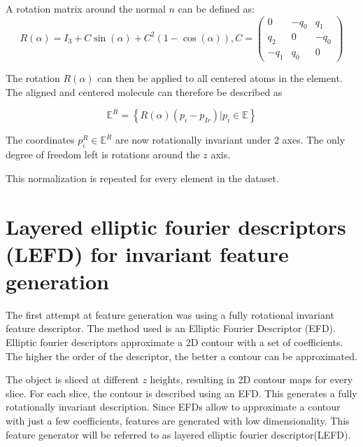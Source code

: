 A rotation matrix around the normal $n$ can be defined as:
$$
R(\alpha) = I_3 + C \sin(\alpha) + C^2(1 - \cos(\alpha)), C =
\begin{pmatrix}
  0 & -q_0 & q_1 \\
  q_2 & 0 & -q_0\\
  -q_1 & q_0 & 0
\end{pmatrix}
$$


The rotation $R(\alpha)$ can then be applied to all centered atoms in the element.
The aligned and centered molecule can therefore be described as

$$ 
\mathbb{E}^R = \left\{ R(\alpha) (p_i - p_{Ir}) |  p_i \in \mathbb{E} \right\}
$$

The coordinates $p^R_i \in \mathbb{E}^R$ are now rotationally invariant under 2 axes. 
The only degree of freedom left is rotations around the $z$ axis. 

This normalization is repeated for every element in the dataset.





\newpage
\section{Layered elliptic fourier descriptors (LEFD) for invariant feature generation}

The first attempt at feature generation was using a fully rotational invariant feature descriptor.
The method used is an Elliptic Fourier Descriptor (EFD).
Elliptic fourier descriptors approximate a 2D contour with a set of coefficients.
The higher the order of the descriptor, the better a contour can be approximated.

The object is sliced at different $z$ heights, resulting in 2D contour maps for every slice.
For each slice, the contour is described using an EFD.
This generates a fully rotationally invariant description.
Since EFDs allow to approximate a contour with just a few coefficients, features are generated with low dimensionality.
This feature generator will be referred to as layered elliptic fourier descriptor(LEFD).

